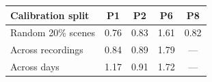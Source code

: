 \begin{tabular}{@{}lcccc@{}}
\hline
Calibration split & P1 & P2 & P6 & P8 \\
\hline
Random 20\% scenes & 0.76 & 0.83 & 1.61 & 0.82 \\
Across recordings & 0.84 & 0.89 & 1.79 & --- \\
Across days & 1.17 & 0.91 & 1.72 & --- \\
\hline
\end{tabular}

